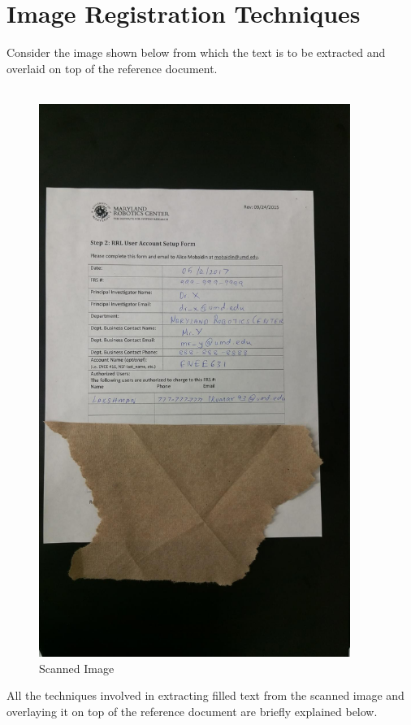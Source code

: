 
\section{Image Registration Techniques}

Consider the image shown below from which the text is to be extracted and overlaid on top of the reference document. 
\\ \\

\begin{figure}[th]
	\centering
	\includegraphics[height=18cm ]{Figures/scanned_image}
	\caption[ScannedImage]{Scanned Image}
	\label{fig:ScannedImage}
\end{figure}

\pagebreak
All the techniques involved in extracting filled text from the scanned image and overlaying it on top of the reference document are briefly explained below. \\

